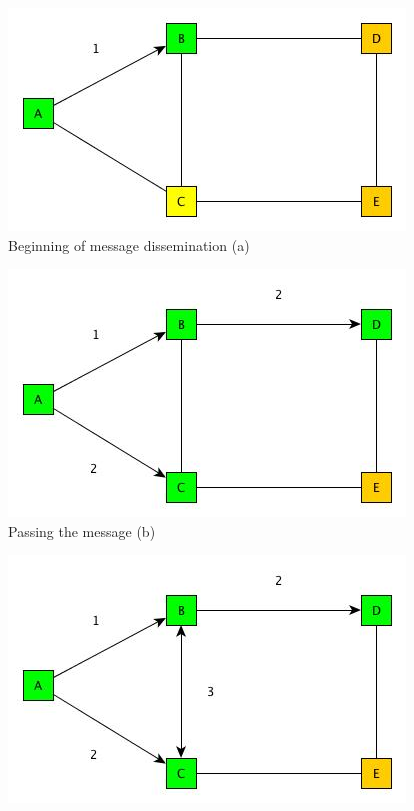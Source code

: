 \begin{figure}[!h]
   \begin{minipage}[t]{0.45\textwidth}
      \vspace{0pt}
      \includegraphics[width=\linewidth]{figures/network_gossip_1.jpg}
      Beginning of message dissemination (a)
   \end{minipage}
   \hfill
   \begin{minipage}[t]{0.45\textwidth}
      \vspace{0pt}
      \includegraphics[width=\linewidth]{figures/network_gossip_2.jpg}
      Passing the message (b)
   \end{minipage}
   \vspace{5ex}
     \begin{center}
     \begin{minipage}[c]{0.45\textwidth}
      \vspace{0pt}
      \includegraphics[width=\linewidth]{figures/network_gossip_3.jpg}

\end{minipage}
\end{center}
\end{figure}
